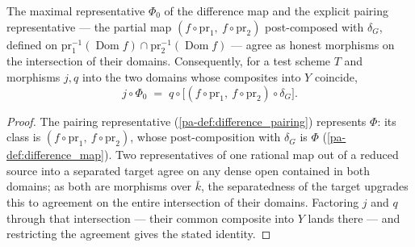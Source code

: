 \begin{lemma}
  \label{pa-lem:diff_representative_agreement}
  \leanok

  The maximal representative \(\Phi_0\) of the difference map and the explicit
  pairing representative --- the partial map \((f \circ \mathrm{pr}_1,\ f \circ
  \mathrm{pr}_2)\) post-composed with \(\delta_G\), defined on
  \(\mathrm{pr}_1^{-1}(\operatorname{Dom} f) \cap
  \mathrm{pr}_2^{-1}(\operatorname{Dom} f)\) --- agree as honest morphisms on the
  intersection of their domains. Consequently, for a test scheme \(T\) and
  morphisms \(j, q\) into the two domains whose composites into \(Y\) coincide,
  \[
    j \circ \Phi_0 \;=\; q \circ \bigl[(f \circ \mathrm{pr}_1,\ f \circ
      \mathrm{pr}_2) \circ \delta_G\bigr].
  \]
\end{lemma}
\begin{proof}
  \leanok
  The pairing representative (\ref{pa-def:difference_pairing}) represents \(\Phi\):
  its class is \((f \circ \mathrm{pr}_1,\ f \circ \mathrm{pr}_2)\), whose
  post-composition with \(\delta_G\) is \(\Phi\) (\ref{pa-def:difference_map}). Two
  representatives of one rational map out of a reduced source into a separated
  target agree on any dense open contained in both domains; as both are morphisms
  over \(\bar k\), the separatedness of the target upgrades this to agreement on
  the entire intersection of their domains. Factoring \(j\) and \(q\) through that
  intersection --- their common composite into \(Y\) lands there --- and
  restricting the agreement gives the stated identity.
\end{proof}

